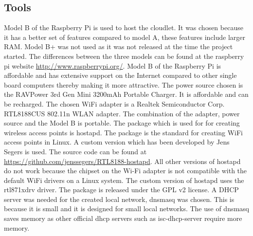 \subsection{Tools}
Model B of the Raspberry Pi is used to host the cloudlet. It was chosen because it has a better set of features compared to model A, these features include larger RAM. Model B+ was not used as it was not released at the time the project started. The differences between the three
models can be found at the raspberry pi website \url{http://www.raspberrypi.org/}. Model B of the Raspberry Pi is affordable and has extensive support on the Internet compared to other single board computers thereby making it more attractive. The power source chosen is the RAVPower 3rd Gen Mini 3200mAh Portable Charger. It is affordable and can be recharged. The chosen WiFi adapter is a Realtek Semiconductor Corp. RTL8188CUS 802.11n WLAN adapter. The combination of the adapter, power source and the Model B is portable. The package which is used for for creating wireless access points is hostapd. The package is the standard for creating WiFi access points in Linux. A custom version which has been developed by Jens Segers is used. The source code can be found at \url{https://github.com/jenssegers/RTL8188-hostapd}. All other versions of hostapd do not work because the chipset on the
Wi-Fi adapter is not compatible with the default WiFi drivers on a Linux system. The custom version of hostapd uses the rtl871xdrv driver. The package is released under the GPL v2 license. A DHCP server was needed for the created local network, dnsmasq was chosen. This is because it is small and it is designed for small local networks. The use of dnsmasq saves memory as other official dhcp servers such as isc-dhcp-server require more memory.

